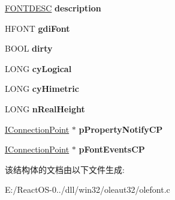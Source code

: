 \begin{DoxyCompactItemize}
\mbox{\label{struct_o_l_e_font_impl_acc975c4faa40082d133efffeb3d97b9a}} 
\hyperlink{structtag_f_o_n_t_d_e_s_c}{F\+O\+N\+T\+D\+E\+SC} {\bfseries description}
\item 
\mbox{\label{struct_o_l_e_font_impl_a6f032c9dc80887e7d76092a7476c96d7}} 
H\+F\+O\+NT {\bfseries gdi\+Font}
\item 
\mbox{\label{struct_o_l_e_font_impl_ac8c666d9c57448dee8f7645120fddc7e}} 
B\+O\+OL {\bfseries dirty}
\item 
\mbox{\label{struct_o_l_e_font_impl_a8d40fe97638811ea9751d0a5e5e2965e}} 
L\+O\+NG {\bfseries cy\+Logical}
\item 
\mbox{\label{struct_o_l_e_font_impl_a7d4816cec8a525c7bd11673a53e69e2d}} 
L\+O\+NG {\bfseries cy\+Himetric}
\item 
\mbox{\label{struct_o_l_e_font_impl_aef4877d0fb9f189a09eda74e294a04ac}} 
L\+O\+NG {\bfseries n\+Real\+Height}
\item 
\mbox{\label{struct_o_l_e_font_impl_a64a98568cdc0bd9cf1b8269b25ece6b5}} 
\hyperlink{interface_i_connection_point}{I\+Connection\+Point} $\ast$ {\bfseries p\+Property\+Notify\+CP}
\item 
\mbox{\label{struct_o_l_e_font_impl_a265777b14d08387985d6105b3accb540}} 
\hyperlink{interface_i_connection_point}{I\+Connection\+Point} $\ast$ {\bfseries p\+Font\+Events\+CP}
\end{DoxyCompactItemize}


该结构体的文档由以下文件生成\+:\begin{DoxyCompactItemize}
\item 
E\+:/\+React\+O\+S-\/0../dll/win32/oleaut32/olefont.\+c\end{DoxyCompactItemize}
